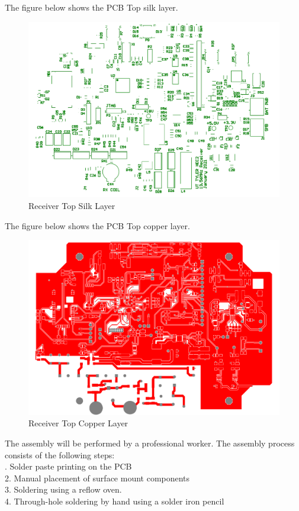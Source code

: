 \documentclass[12pt]{article}
\begin{document}
 \indent
The figure below shows the PCB Top silk layer.

\begin{figure}[h!]
\centering
\includegraphics[width=0.88\linewidth]{rx_pcb_tslk}
\caption{Receiver Top Silk Layer}
\end{figure}

\hfill
\pagebreak
\hfill

\indent
The figure below shows the PCB Top copper layer.
\hfill

\begin{figure}[h!]
\centering
\includegraphics[width=0.75\linewidth]{rx_pcb_top_metal}
\caption{Receiver Top Copper Layer}
\end{figure}

\noindent
The assembly will be performed by a professional worker. The assembly process consists of the following steps:\\
 
 .    Solder paste printing on the PCB\\
2.    Manual placement of surface mount components\\
3.    Soldering using a reflow oven.\\
4.    Through-hole soldering by hand using a solder iron pencil\\
 
\end{document}
